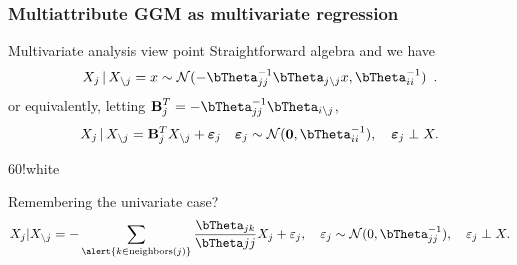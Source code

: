 \begin{frame}
  \frametitle{Multiattribute GGM as multivariate regression}

  \begin{block}{Multivariate analysis view point}
    Straightforward algebra and we have
    \begin{equation*}
      \label{eq:condK}
      X_j \, |\,  X_{\backslash j}  = x \sim  \mathcal{N}(- \invcov_{jj}^{-1}\invcov_{j
        \backslash j} x , \invcov_{ii}^{-1})\enskip.
    \end{equation*}
    or   equivalently,    letting   $\displaystyle    \mathbf{B}_j^T   =
    -\invcov_{jj}^{-1} \invcov_{i\backslash j}$,
    \begin{equation*}
      \label{eq:condK}
      X_j \, |\, X_{\backslash j} = \mathbf{B}_j^T X_{\backslash j} +
      \boldsymbol\varepsilon_j \quad \boldsymbol\varepsilon_j
      \sim \mathcal{N}(\mathbf{0},\invcov_{ii}^{-1}), \quad \boldsymbol\varepsilon_j \perp X.
    \end{equation*}
  \end{block}

    \begin{colormixin}{60!white}
      \begin{block}{Remembering the univariate case?}
        \[
        X_j   |    X_{   \setminus    j}   =   -    \sum_{\alert{k   \in
            \text{neighbors}(j)}} \frac{\invcov_{jk}}{\invcov{jj}}  X_j +
        \varepsilon_j,\quad              \varepsilon_j              \sim
        \mathcal{N}(0,\invcov_{jj}^{-1}), \quad \varepsilon_j \perp X.
        \]
      \end{block}
    \end{colormixin}
\end{frame}

